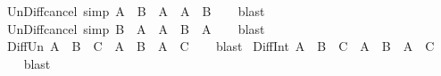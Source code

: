 \begin{isabellebody}
\isamarkupfalse%
\ Un{\isacharunderscore}{\kern0pt}Diff{\isacharunderscore}{\kern0pt}cancel\ {\isacharbrackleft}{\kern0pt}simp{\isacharbrackright}{\kern0pt}{\isacharcolon}{\kern0pt}\ {\isachardoublequoteopen}A\ {\isasymunion}\ {\isacharparenleft}{\kern0pt}B\ {\isacharminus}{\kern0pt}\ A{\isacharparenright}{\kern0pt}\ {\isacharequal}{\kern0pt}\ A\ {\isasymunion}\ B{\isachardoublequoteclose}\isanewline
%
\isadelimproof
\ \ %
\endisadelimproof
%
\isatagproof
{}\isamarkupfalse%
\ blast%
\endisatagproof
{\isafoldproof}%
%
\isadelimproof
\isanewline
%
\endisadelimproof
\isanewline
{}\isamarkupfalse%
\ Un{\isacharunderscore}{\kern0pt}Diff{\isacharunderscore}{\kern0pt}cancel{}\ {\isacharbrackleft}{\kern0pt}simp{\isacharbrackright}{\kern0pt}{\isacharcolon}{\kern0pt}\ {\isachardoublequoteopen}{\isacharparenleft}{\kern0pt}B\ {\isacharminus}{\kern0pt}\ A{\isacharparenright}{\kern0pt}\ {\isasymunion}\ A\ {\isacharequal}{\kern0pt}\ B\ {\isasymunion}\ A{\isachardoublequoteclose}\isanewline
%
\isadelimproof
\ \ %
\endisadelimproof
%
\isatagproof
{}\isamarkupfalse%
\ blast%
\endisatagproof
{\isafoldproof}%
%
\isadelimproof
\isanewline
%
\endisadelimproof
\isanewline
{}\isamarkupfalse%
\ Diff{\isacharunderscore}{\kern0pt}Un{\isacharcolon}{\kern0pt}\ {\isachardoublequoteopen}A\ {\isacharminus}{\kern0pt}\ {\isacharparenleft}{\kern0pt}B\ {\isasymunion}\ C{\isacharparenright}{\kern0pt}\ {\isacharequal}{\kern0pt}\ {\isacharparenleft}{\kern0pt}A\ {\isacharminus}{\kern0pt}\ B{\isacharparenright}{\kern0pt}\ {\isasyminter}\ {\isacharparenleft}{\kern0pt}A\ {\isacharminus}{\kern0pt}\ C{\isacharparenright}{\kern0pt}{\isachardoublequoteclose}\isanewline
%
\isadelimproof
\ \ %
\endisadelimproof
%
\isatagproof
{}\isamarkupfalse%
\ blast%
\endisatagproof
{\isafoldproof}%
%
\isadelimproof
\isanewline
%
\endisadelimproof
\isanewline
{}\isamarkupfalse%
\ Diff{\isacharunderscore}{\kern0pt}Int{\isacharcolon}{\kern0pt}\ {\isachardoublequoteopen}A\ {\isacharminus}{\kern0pt}\ {\isacharparenleft}{\kern0pt}B\ {\isasyminter}\ C{\isacharparenright}{\kern0pt}\ {\isacharequal}{\kern0pt}\ {\isacharparenleft}{\kern0pt}A\ {\isacharminus}{\kern0pt}\ B{\isacharparenright}{\kern0pt}\ {\isasymunion}\ {\isacharparenleft}{\kern0pt}A\ {\isacharminus}{\kern0pt}\ C{\isacharparenright}{\kern0pt}{\isachardoublequoteclose}\isanewline
%
\isadelimproof
\ \ %
\endisadelimproof
%
\isatagproof
{}\isamarkupfalse%
\ blast%
\endisatagproof
{\isafoldproof}%
%
\isadelimproof
\isanewline
%
\endisadelimproof

\end{isabellebody}
